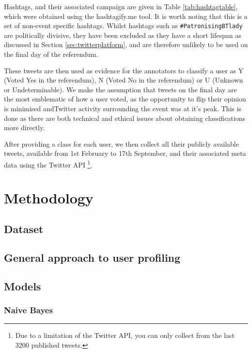 \documentclass[bsc,frontabs,singlespacing,parskip]{infthesis}     %
\begin{document}
Hashtags, and their associated campaign are given in Table \ref{tab:hashtagtable}, which were obtained using the hashtagify.me tool. It is worth noting that this is a set of non-event specific hashtags. Whilst hashtags such as \texttt{\#PatronisingBTlady}\cite{patronisingbtlady} are politically divisive, they have been excluded as they have a short lifespan as discussed in Section \ref{sec:twitterplatform}, and are therefore unlikely to be used on the final day of the referendum. 


These tweets are then used as evidence for the annotators to classify a user as Y (Voted Yes in the referendum), N (Voted No in the referendum) or U (Unknown or Undeterminable). We make the assumption that tweets on the final day are the most emblematic of how a user voted, as the opportunity to flip their opinion is minimised andTwitter activity surrounding the event was at it's peak. This is done as there are both technical and ethical issues about obtaining classifications more directly.

After providing a class for each user, we then collect all their publicly available tweets, available from 1st February to 17th September, and their associated meta data using the Twitter API \footnote{Due to a limitation of the Twitter API, you can only collect from the last 3200 published tweets.}. 


\chapter{Methodology}
\label{ch:method}


\section{Dataset}


\section{General approach to user profiling}
\section{Models}
\subsection{Naive Bayes}
\end{document}
